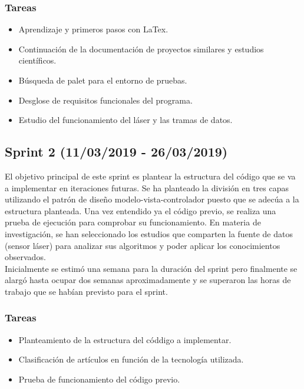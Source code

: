 \subsubsection{Tareas}

\begin{itemize}
\item Aprendizaje y primeros pasos con LaTex.
\item Continuación de la documentación de proyectos similares y estudios científicos.
\item Búsqueda de palet para el entorno de pruebas.
\item Desglose de requisitos funcionales del programa.
\item Estudio del funcionamiento del láser y las tramas de datos.
\end{itemize}


\subsection{Sprint 2 (11/03/2019 - 26/03/2019)}
El objetivo principal de este sprint es plantear la estructura del código que se va a implementar en iteraciones futuras. Se ha planteado la división en tres capas utilizando el patrón de diseño modelo-vista-controlador puesto que se adecúa a la estructura planteada. Una vez entendido ya el código previo, se realiza una prueba de ejecución para comprobar su funcionamiento.
En materia de investigación, se han seleccionado los estudios que comparten la fuente de datos (sensor láser) para analizar sus algoritmos y poder aplicar los conocimientos observados.\\
Inicialmente se estimó una semana para la duración del sprint pero finalmente se alargó hasta ocupar dos semanas aproximadamente y se superaron las horas de trabajo que se habían previsto para el sprint.

\subsubsection{Tareas}
\begin{itemize}
\item Planteamiento de la estructura del códdigo a implementar.
\item Clasificación de artículos en función de la tecnología utilizada.
\item Prueba de funcionamiento del código previo.
\end{itemize}

